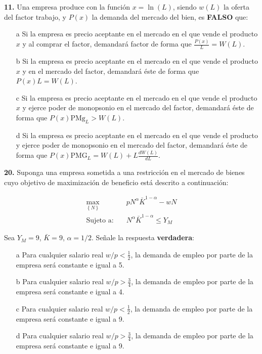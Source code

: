 \documentclass{nuevotema}
\begin{document}
\textbf{11.} Una empresa produce con la función $x=\ln (L)$, siendo $w(L)$ la oferta del factor trabajo, y $P(x)$ la demanda del mercado del bien, es \textbf{FALSO} que:
\begin{enumerate}
	\item[a] Si la empresa es precio aceptante en el mercado en el que vende el producto $x$ y al comprar el factor, demandará factor de forma que $\frac{P(x)}{L} = W(L)$.
	\item[b] Si la empresa es precio aceptante en el mercado en el que vende el producto $x$ y en el mercado del factor, demandará éste de forma que $P(x) L = W(L)$. 
	\item[c] Si la empresa es precio aceptante en el mercado en el que vende el producto $x$ y ejerce poder de monopsonio en el mercado del factor, demandará éste de forma que $P(x) \text{PMg}_L > W(L)$.
	\item[d] Si la empresa es precio aceptante en el mercado en el que vende el producto y ejerce poder de monopsonio en el mercado del factor, demandará éste de forma que $P(x) \text{PMG}_L = W(L) + L \frac{dW(L)}{dL}$.
\end{enumerate}


\textbf{20.} Suponga una empresa sometida a una restricción en el mercado de bienes cuyo objetivo de maximización de beneficio está descrito a continuación:

\begin{align*}
	\underset{\left\lbrace N \right\rbrace }{\max}\quad &p N^\alpha \bar{K}^{1-\alpha} - w N \\
	\text{Sujeto a:}\quad &N^\alpha \bar{K}^{1-\alpha} \leq Y_M 
\end{align*}

Sea $Y_M = 9$, $\bar{K} = 9$, $\alpha = 1/2$. Señale la respuesta \textbf{verdadera}:
\begin{enumerate}
	\item[a] Para cualquier salario real $w/p< \frac{1}{2}$, la demanda de empleo por parte de la empresa será constante e igual a 5.
	\item[b] Para cualquier salario real $w/p> \frac{3}{4}$, la demanda de empleo por parte de la empresa será constante e igual a 4.
	\item[c] Para cualquier salario real $w/p< \frac{1}{2}$, la demanda de empleo por parte de la empresa será constante e igual a 9.
	\item[d] Para cualquier salario real $w/p> \frac{3}{4}$, la demanda de empleo por parte de la empresa será constante e igual a 9.
\end{enumerate}
\end{document}
